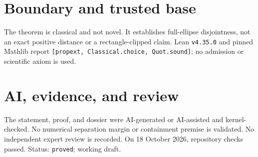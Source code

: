 \documentclass[11pt]{article}
\begin{document}
\section{Boundary and trusted base}
The theorem is classical and not novel. It establishes full-ellipse disjointness, not an
exact positive distance or a rectangle-clipped claim. Lean \texttt{v4.35.0} and pinned
Mathlib report \texttt{[propext, Classical.choice, Quot.sound]}; no admission or
scientific axiom is used.

\section{AI, evidence, and review}
The statement, proof, and dossier were AI-generated or AI-assisted and kernel-checked.
No numerical separation margin or containment premise is validated. No independent
expert review is recorded. On 18 October 2026, repository checks passed. Status:
\texttt{proved}; working draft.
\end{document}
